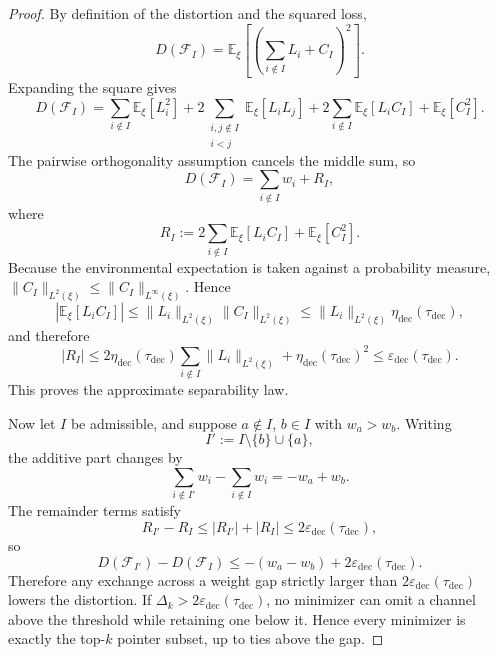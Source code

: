 \documentclass[12pt]{article}
\theoremstyle{definition}
\theoremstyle{remark}
\begin{document}
\begin{proof}
By definition of the distortion and the squared loss,
\[
D(\mathcal F_I)
=
\mathbb E_\xi\!\left[
\left(
\sum_{i\notin I}L_i + C_I
\right)^2
\right].
\]
Expanding the square gives
\[
D(\mathcal F_I)
=
\sum_{i\notin I}\mathbb E_\xi[L_i^2]
+
2\sum_{\substack{i,j\notin I\\ i<j}}\mathbb E_\xi[L_iL_j]
+
2\sum_{i\notin I}\mathbb E_\xi[L_iC_I]
+
\mathbb E_\xi[C_I^2].
\]
The pairwise orthogonality assumption cancels the middle sum, so
\[
D(\mathcal F_I)
=
\sum_{i\notin I} w_i + R_I,
\]
where
\[
R_I
:=
2\sum_{i\notin I}\mathbb E_\xi[L_iC_I]
+
\mathbb E_\xi[C_I^2].
\]
Because the environmental expectation is taken against a probability
measure, \(\|C_I\|_{L^2(\xi)}\le \|C_I\|_{L^\infty(\xi)}\). Hence
\[
|\mathbb E_\xi[L_iC_I]|
\le
\|L_i\|_{L^2(\xi)}\|C_I\|_{L^2(\xi)}
\le
\|L_i\|_{L^2(\xi)}\eta_{\mathrm{dec}}(\tau_{\mathrm{dec}}),
\]
and therefore
\[
|R_I|
\le
2\eta_{\mathrm{dec}}(\tau_{\mathrm{dec}})
\sum_{i\notin I}\|L_i\|_{L^2(\xi)}
+
\eta_{\mathrm{dec}}(\tau_{\mathrm{dec}})^2
\le
\varepsilon_{\mathrm{dec}}(\tau_{\mathrm{dec}}).
\]
This proves the approximate separability law.

Now let \(I\) be admissible, and suppose \(a\notin I\), \(b\in I\) with
\(w_a>w_b\). Writing
\[
I':=I\setminus\{b\}\cup\{a\},
\]
the additive part changes by
\[
\sum_{i\notin I'}w_i-\sum_{i\notin I}w_i
=
-w_a+w_b.
\]
The remainder terms satisfy
\[
R_{I'}-R_I
\le
|R_{I'}|+|R_I|
\le
2\varepsilon_{\mathrm{dec}}(\tau_{\mathrm{dec}}),
\]
so
\[
D(\mathcal F_{I'})-D(\mathcal F_I)
\le
-(w_a-w_b)+2\varepsilon_{\mathrm{dec}}(\tau_{\mathrm{dec}}).
\]
Therefore any exchange across a weight gap strictly larger than
\(2\varepsilon_{\mathrm{dec}}(\tau_{\mathrm{dec}})\) lowers the
distortion. If
\(\Delta_k>2\varepsilon_{\mathrm{dec}}(\tau_{\mathrm{dec}})\), no
minimizer can omit a channel above the threshold while retaining one
below it. Hence every minimizer is exactly the top-\(k\) pointer subset,
up to ties above the gap.
\end{proof}
\end{document}
